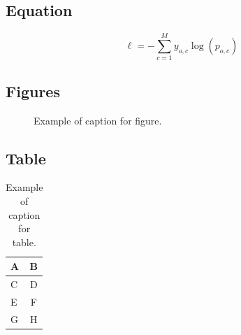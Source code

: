 \documentclass[nouppercase]{kaia}
\begin{document}
\subsection{Equation}
\begin{equation}
\ell = -\sum^M_{c=1} y_{o,c} \log (p_{o,c})	
\end{equation}

\subsection{Figures}
\begin{figure}[h]
\begin{center}
\fbox{\rule{0pt}{2in} \rule{0.9\linewidth}{0pt}}
\end{center}
   \caption{Example of caption for figure.}
\end{figure}

\subsection{Table}
\begin{table}[h]
\begin{center}
\begin{tabular}{|l|c|}
\hline
A & B \\
\hline\hline
C & D \\
E & F \\
G & H\\
\hline
\end{tabular}
\end{center}
\caption{Example of caption for table.}
\end{table}




\newpage
\newpage
\end{document}
